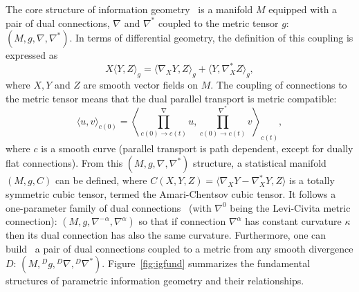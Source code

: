 \documentclass[graybox]{svmult}
\def\Inner#1#2{{\left\langle #1,#2\right\rangle}}
\def\inner#1#2{{\langle #1,#2\rangle}}
\begin{document}
The core structure of information geometry~\cite{IG-2016} is a manifold $M$ equipped with a pair of dual connections, $\nabla$ and $\nabla^*$ coupled to the metric tensor $g$: $(M,g,\nabla,\nabla^*)$. In terms of differential geometry, the definition of this coupling is expressed as
\begin{equation}
X{\inner{Y}{Z}}_g = {\inner{\nabla_X Y}{Z}}_g +  {\inner{Y}{\nabla_X^* Z}}_g,
\end{equation}
where $X, Y$ and $Z$ are smooth vector fields on $M$.
The coupling of connections to the metric tensor means that the dual parallel transport is metric compatible:
\begin{equation}
\inner{u}{v}_{c(0)}  = \Inner{\prod_{c(0)\rightarrow c(t)}^\nabla u}{\prod_{c(0)\rightarrow c(t)}^{\nabla^*} v}_{c(t)},
\end{equation}
where $c$ is a smooth curve (parallel transport is path dependent, except for dually flat connections).
From this $(M,g,\nabla,\nabla^*)$ structure, a statistical manifold~\cite{Lauritzen-1987} $(M,g,C)$ can be defined, where 
$C(X,Y,Z)=\inner{\nabla_X Y-\nabla^*_X Y}{Z}$ is a totally symmetric cubic tensor, termed the Amari-Chentsov cubic tensor. 
It follows a one-parameter family of dual connections~\cite{IG-2016} (with $\nabla^0$ being the Levi-Civita metric connection): $(M,g,\nabla^{-\alpha},\nabla^\alpha)$ so that if connection $\nabla^\alpha$ has constant curvature $\kappa$ then its dual connection has also the same curvature.
Furthermore, one can build~\cite{Eguchi-1983,Eguchi-1992,IG-2016} a pair of dual connections coupled to a metric from any smooth divergence $D$: $(M,{}^Dg,{}^D\nabla,{}^D\nabla^*)$.
Figure~\ref{fig:igfund} summarizes the fundamental structures of parametric information geometry and their relationships.
\end{document}
